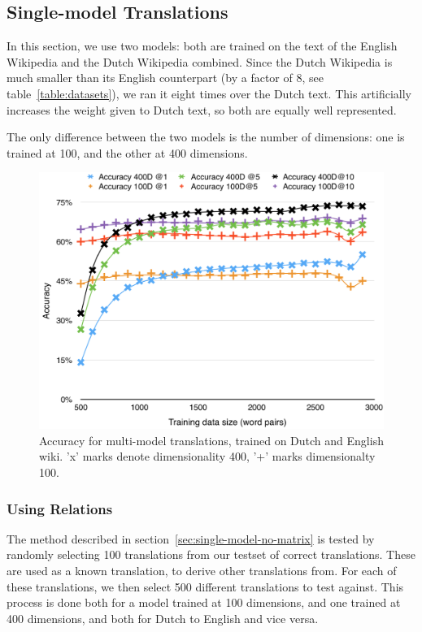 \subsection{Single-model Translations}
In this section, we use two models: both are trained on the text of the English Wikipedia and the Dutch Wikipedia combined. Since the Dutch Wikipedia is much smaller than its English counterpart (by a factor of 8, see table~\ref{table:datasets}), we ran it eight times over the Dutch text. This artificially increases the weight given to Dutch text, so both are equally well represented.

The only difference between the two models is the number of dimensions: one is trained at 100, and the other at 400 dimensions.

\begin{figure}[ht!]
  \centering \includegraphics[width=\linewidth]{images/accuracy_single_model_wikis}
  \caption{Accuracy for multi-model translations, trained on Dutch and English wiki. 'x' marks denote dimensionality 400, '+' marks dimensionalty 100.}
  \label{fig:accuracy_single_model_wikis}
\end{figure}

\subsubsection{Using Relations}
The method described in section~\ref{sec:single-model-no-matrix} is tested by randomly selecting 100 translations from our testset of correct translations. These are used as a known translation, to derive other translations from. For each of these translations, we then select 500 different translations to test against. This process is done both for a model trained at 100 dimensions, and one trained at 400 dimensions, and both for Dutch to English and vice versa.

